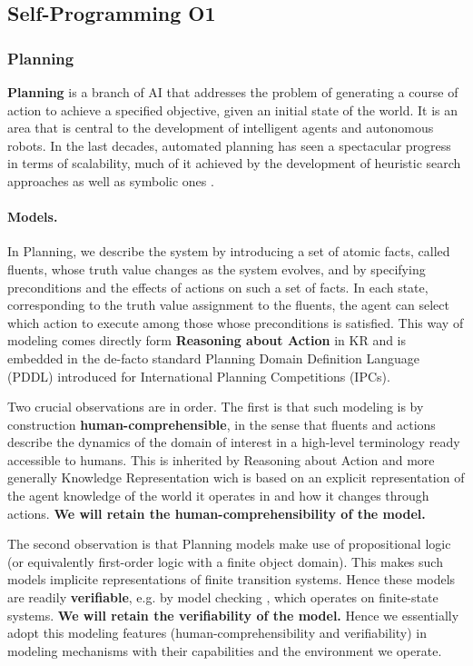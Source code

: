 \subsection{Self-Programming O1}
\subsubsection{Planning}



\textbf{Planning} is a branch of AI that addresses the problem of generating a
course of action to achieve a specified objective, given an initial
state of the world. It is an area that is central to the development
of intelligent agents and autonomous robots. In the last decades,
automated planning has seen a spectacular progress in terms of
scalability, much of it achieved by the development of heuristic
search approaches as well as symbolic ones  \cite{GeffnerBo13,GNT2016}.

\paragraph{Models.} In Planning, we describe the system by introducing a set of
atomic facts, called fluents, whose truth value changes as the system
evolves, and by specifying preconditions and the effects of actions on
such a set of facts. In each state, corresponding to the truth value
assignment to the fluents, the agent can select which action to
execute among those whose preconditions is satisfied. This way of
modeling comes directly form \textbf{Reasoning about Action} in KR
\cite{Reiter01} and is embedded in the de-facto standard Planning
Domain Definition Language (PDDL) \cite{mcdermott:pddl,gerevini:pddl}
introduced for International Planning Competitions (IPCs).

Two crucial observations are in order. The first is that such modeling
is by construction \textbf{human-comprehensible}, in the sense that
fluents and actions describe the dynamics of the domain of interest in
a high-level terminology ready accessible to humans. This is inherited
by Reasoning about Action and more generally Knowledge Representation
wich is based on an explicit representation of the agent knowledge of
the world it operates in and how it changes through
actions. \textbf{We will retain the human-comprehensibility of the model.}

The second observation is that Planning models make use of
propositional logic (or equivalently first-order logic with a finite
object domain). This makes such models implicite representations of
finite transition systems. Hence these models are readily
\textbf{verifiable}, e.g. by model checking
\cite{ClarkeGP:99-ModelChecking,BaKG08,LomuscioQR17}, which operates
on finite-state systems. \textbf{We will retain the
  verifiability of the model.}
Hence we essentially adopt this modeling features (human-comprehensibility and verifiability) in modeling \project  mechanisms with their
capabilities and the environment we operate. 


